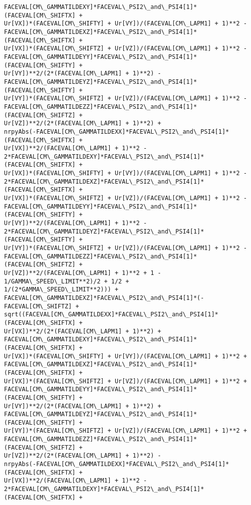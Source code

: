\documentclass[landscape,letterpaper,10pt,english]{article}
\begin{document}
\begin{Verbatim}[commandchars=\\\{\}]
FACEVAL[CM\_GAMMATILDEXY]*FACEVAL\_PSI2\_and\_PSI4[1]*(FACEVAL[CM\_SHIFTX] +
Ur[VX])*(FACEVAL[CM\_SHIFTY] + Ur[VY])/(FACEVAL[CM\_LAPM1] + 1)**2 -
FACEVAL[CM\_GAMMATILDEXZ]*FACEVAL\_PSI2\_and\_PSI4[1]*(FACEVAL[CM\_SHIFTX] +
Ur[VX])*(FACEVAL[CM\_SHIFTZ] + Ur[VZ])/(FACEVAL[CM\_LAPM1] + 1)**2 -
FACEVAL[CM\_GAMMATILDEYY]*FACEVAL\_PSI2\_and\_PSI4[1]*(FACEVAL[CM\_SHIFTY] +
Ur[VY])**2/(2*(FACEVAL[CM\_LAPM1] + 1)**2) -
FACEVAL[CM\_GAMMATILDEYZ]*FACEVAL\_PSI2\_and\_PSI4[1]*(FACEVAL[CM\_SHIFTY] +
Ur[VY])*(FACEVAL[CM\_SHIFTZ] + Ur[VZ])/(FACEVAL[CM\_LAPM1] + 1)**2 -
FACEVAL[CM\_GAMMATILDEZZ]*FACEVAL\_PSI2\_and\_PSI4[1]*(FACEVAL[CM\_SHIFTZ] +
Ur[VZ])**2/(2*(FACEVAL[CM\_LAPM1] + 1)**2) +
nrpyAbs(-FACEVAL[CM\_GAMMATILDEXX]*FACEVAL\_PSI2\_and\_PSI4[1]*(FACEVAL[CM\_SHIFTX] +
Ur[VX])**2/(FACEVAL[CM\_LAPM1] + 1)**2 -
2*FACEVAL[CM\_GAMMATILDEXY]*FACEVAL\_PSI2\_and\_PSI4[1]*(FACEVAL[CM\_SHIFTX] +
Ur[VX])*(FACEVAL[CM\_SHIFTY] + Ur[VY])/(FACEVAL[CM\_LAPM1] + 1)**2 -
2*FACEVAL[CM\_GAMMATILDEXZ]*FACEVAL\_PSI2\_and\_PSI4[1]*(FACEVAL[CM\_SHIFTX] +
Ur[VX])*(FACEVAL[CM\_SHIFTZ] + Ur[VZ])/(FACEVAL[CM\_LAPM1] + 1)**2 -
FACEVAL[CM\_GAMMATILDEYY]*FACEVAL\_PSI2\_and\_PSI4[1]*(FACEVAL[CM\_SHIFTY] +
Ur[VY])**2/(FACEVAL[CM\_LAPM1] + 1)**2 -
2*FACEVAL[CM\_GAMMATILDEYZ]*FACEVAL\_PSI2\_and\_PSI4[1]*(FACEVAL[CM\_SHIFTY] +
Ur[VY])*(FACEVAL[CM\_SHIFTZ] + Ur[VZ])/(FACEVAL[CM\_LAPM1] + 1)**2 -
FACEVAL[CM\_GAMMATILDEZZ]*FACEVAL\_PSI2\_and\_PSI4[1]*(FACEVAL[CM\_SHIFTZ] +
Ur[VZ])**2/(FACEVAL[CM\_LAPM1] + 1)**2 + 1 - 1/GAMMA\_SPEED\_LIMIT**2)/2 + 1/2 +
1/(2*GAMMA\_SPEED\_LIMIT**2))) +
FACEVAL[CM\_GAMMATILDEXZ]*FACEVAL\_PSI2\_and\_PSI4[1]*(-FACEVAL[CM\_SHIFTZ] +
sqrt((FACEVAL[CM\_GAMMATILDEXX]*FACEVAL\_PSI2\_and\_PSI4[1]*(FACEVAL[CM\_SHIFTX] +
Ur[VX])**2/(2*(FACEVAL[CM\_LAPM1] + 1)**2) +
FACEVAL[CM\_GAMMATILDEXY]*FACEVAL\_PSI2\_and\_PSI4[1]*(FACEVAL[CM\_SHIFTX] +
Ur[VX])*(FACEVAL[CM\_SHIFTY] + Ur[VY])/(FACEVAL[CM\_LAPM1] + 1)**2 +
FACEVAL[CM\_GAMMATILDEXZ]*FACEVAL\_PSI2\_and\_PSI4[1]*(FACEVAL[CM\_SHIFTX] +
Ur[VX])*(FACEVAL[CM\_SHIFTZ] + Ur[VZ])/(FACEVAL[CM\_LAPM1] + 1)**2 +
FACEVAL[CM\_GAMMATILDEYY]*FACEVAL\_PSI2\_and\_PSI4[1]*(FACEVAL[CM\_SHIFTY] +
Ur[VY])**2/(2*(FACEVAL[CM\_LAPM1] + 1)**2) +
FACEVAL[CM\_GAMMATILDEYZ]*FACEVAL\_PSI2\_and\_PSI4[1]*(FACEVAL[CM\_SHIFTY] +
Ur[VY])*(FACEVAL[CM\_SHIFTZ] + Ur[VZ])/(FACEVAL[CM\_LAPM1] + 1)**2 +
FACEVAL[CM\_GAMMATILDEZZ]*FACEVAL\_PSI2\_and\_PSI4[1]*(FACEVAL[CM\_SHIFTZ] +
Ur[VZ])**2/(2*(FACEVAL[CM\_LAPM1] + 1)**2) -
nrpyAbs(-FACEVAL[CM\_GAMMATILDEXX]*FACEVAL\_PSI2\_and\_PSI4[1]*(FACEVAL[CM\_SHIFTX] +
Ur[VX])**2/(FACEVAL[CM\_LAPM1] + 1)**2 -
2*FACEVAL[CM\_GAMMATILDEXY]*FACEVAL\_PSI2\_and\_PSI4[1]*(FACEVAL[CM\_SHIFTX] +

\end{Verbatim}
\end{document}
